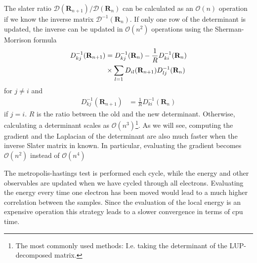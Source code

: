\documentclass[a4paper,10pt,twocolumn]{article} %
\newcommand{\ts}[1]{\textbf{#1}}
\begin{document}
The slater ratio $\mathcal D(\ts R_{n+1})/\mathcal D(\ts R_n)$ can be calculated as an $\mathcal O(n)$ operation if we know the inverse matrix $\mathcal D^{-1}(\ts R_n)$.
If only one row of the determinant is updated, the inverse can be updated in $\mathcal O(n^2)$ operations using the Sherman-Morrison formula \cite{hammond}
\begin{align}
D_{kj}^{-1}(\ts R_{n+1}) &= D_{kj}^{-1}(\ts R_{n}) - \frac1R D_{ki}^{-1}(\ts R_{n}) \notag\\
								&\times\sum_{l=1} D_{il}(\ts R_{n+1}) D_{lj}^{-1}(\ts R_{n})
\end{align}
for $j\neq i$ and
\begin{align}
		D_{kj}^{-1}(\ts R_{n+1}) & = \frac1R D_{ki}^{-1}(\ts R_{n})
\end{align}
if  $j= i$. $R$ is the ratio between the old and the new determinant.
Otherwise, calculating a determinant scales as $\mathcal O(n^3)$\footnote{The most commonly used methods: I.e. taking the determinant of the LUP-decomposed matrix.}. 
As we will see, computing the gradient and the Laplacian of the determinant are also much faster when the inverse Slater matrix in known. 
In particular, evaluating the gradient becomes $\mathcal O(n^2)$ instead of $\mathcal O(n^4)$

The metropolis-hastings test is performed each cycle, while the energy and other observables are updated when we have cycled through all electrons. 
Evaluating the energy every time one electron has been moved would lead to a much higher correlation between the samples. Since the evaluation of the local energy
is an expensive operation this strategy leads to a slower convergence in terms of cpu time.
%

\end{document}
